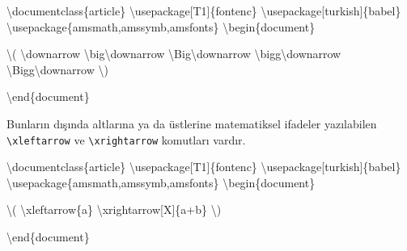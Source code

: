 \documentclass[
  letterpaper,
  DIV=11,
  numbers=noendperiod]{scrreprt}
\newenvironment{Shaded}{\begin{snugshade}}{\end{snugshade}}
\newcommand{\BuiltInTok}[1]{\textcolor[rgb]{0.00,0.23,0.31}{#1}}
\newcommand{\ExtensionTok}[1]{\textcolor[rgb]{0.00,0.23,0.31}{#1}}
\newcommand{\KeywordTok}[1]{\textcolor[rgb]{0.00,0.23,0.31}{#1}}
\newcommand{\NormalTok}[1]{\textcolor[rgb]{0.00,0.23,0.31}{#1}}
\newcommand{\SpecialCharTok}[1]{\textcolor[rgb]{0.37,0.37,0.37}{#1}}
\newcommand{\SpecialStringTok}[1]{\textcolor[rgb]{0.13,0.47,0.30}{#1}}
\begin{document}
\begin{Shaded}
\begin{Highlighting}[]
\BuiltInTok{\textbackslash{}documentclass}\NormalTok{\{}\ExtensionTok{article}\NormalTok{\}}
\BuiltInTok{\textbackslash{}usepackage}\NormalTok{[T1]\{}\ExtensionTok{fontenc}\NormalTok{\}}
\BuiltInTok{\textbackslash{}usepackage}\NormalTok{[turkish]\{}\ExtensionTok{babel}\NormalTok{\}}
\BuiltInTok{\textbackslash{}usepackage}\NormalTok{\{}\ExtensionTok{amsmath,amssymb,amsfonts}\NormalTok{\}}
\KeywordTok{\textbackslash{}begin}\NormalTok{\{}\ExtensionTok{document}\NormalTok{\}}

\SpecialStringTok{\textbackslash{}(}
\SpecialCharTok{\textbackslash{}downarrow}
\SpecialCharTok{\textbackslash{}big\textbackslash{}downarrow}
\SpecialCharTok{\textbackslash{}Big\textbackslash{}downarrow}
\SpecialCharTok{\textbackslash{}bigg\textbackslash{}downarrow}
\SpecialCharTok{\textbackslash{}Bigg\textbackslash{}downarrow}
\SpecialStringTok{\textbackslash{})}

\KeywordTok{\textbackslash{}end}\NormalTok{\{}\ExtensionTok{document}\NormalTok{\}}
\end{Highlighting}
\end{Shaded}

Bunların dışında altlarına ya da üstlerine matematiksel ifadeler
yazılabilen \texttt{\textbackslash{}xleftarrow} ve
\texttt{\textbackslash{}xrightarrow} komutları vardır.

\begin{Shaded}
\begin{Highlighting}[]
\BuiltInTok{\textbackslash{}documentclass}\NormalTok{\{}\ExtensionTok{article}\NormalTok{\}}
\BuiltInTok{\textbackslash{}usepackage}\NormalTok{[T1]\{}\ExtensionTok{fontenc}\NormalTok{\}}
\BuiltInTok{\textbackslash{}usepackage}\NormalTok{[turkish]\{}\ExtensionTok{babel}\NormalTok{\}}
\BuiltInTok{\textbackslash{}usepackage}\NormalTok{\{}\ExtensionTok{amsmath,amssymb,amsfonts}\NormalTok{\}}
\KeywordTok{\textbackslash{}begin}\NormalTok{\{}\ExtensionTok{document}\NormalTok{\}}

\SpecialStringTok{\textbackslash{}(}
\SpecialCharTok{\textbackslash{}xleftarrow}\SpecialStringTok{\{a\}}
\SpecialCharTok{\textbackslash{}xrightarrow}\SpecialStringTok{[X]\{a+b\}}
\SpecialStringTok{\textbackslash{})}

\KeywordTok{\textbackslash{}end}\NormalTok{\{}\ExtensionTok{document}\NormalTok{\}}
\end{Highlighting}
\end{Shaded}
\end{document}
